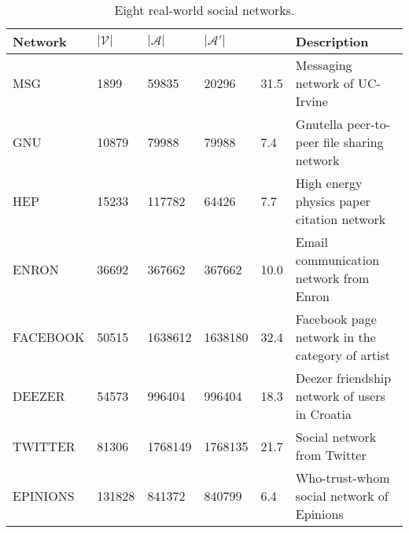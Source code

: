 \documentclass[a4paper,10pt]{article}
\theoremstyle{plain}
\begin{document}
{	\begin{table}[h]
		\footnotesize
		\centering
		\caption{Eight real-world social networks.}\label{table: instances}
		\setlength{\tabcolsep}{2pt}
		\renewcommand{\arraystretch}{1.5}
		\begin{tabular}{|lllll|l|}
			\hline
			{Network} & $|\mathcal{V}|$&{$|\mathcal{A}|$}&$|\mathcal{A}'|$&\makecell[l]{$\rho$}&{Description}\\
			\hline
			MSG&1899&59835& 20296& 31.5 &Messaging network of UC-Irvine \cite{MSG}\\
			GNU&10879&79988& 79988& 7.4 &Gnutella peer-to-peer file sharing network	 \cite{GNU}\\
			HEP&15233&117782& 64426& 7.7 &High energy physics paper citation network \cite{HEP}\\
			ENRON&36692&367662& 367662& 10.0 & Email communication network from Enron \cite{ENRON}\\
			FACEBOOK &50515&1638612&1638180 &32.4  &Facebook page network in the category of artist \cite{FACEBOOK}\\
			DEEZER & 54573 & 996404 & 996404& 18.3 & Deezer friendship network of users in Croatia \cite{FACEBOOK}\\
			TWITTER&81306&1768149& 1768135& 21.7 & Social network from Twitter \cite{TWITTER}\\
			EPINIONS &131828&841372& 840799& 6.4 & Who-trust-whom social network of Epinions \cite{EPI2}\\
			\hline
		\end{tabular}
	\end{table}
	
	
}
\end{document}
